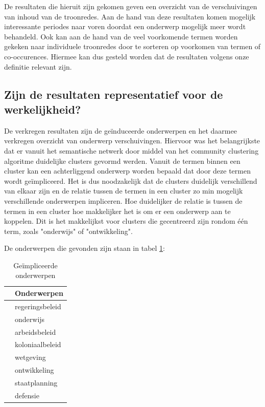 De resultaten die hieruit zijn gekomen geven een overzicht van de verschuivingen van inhoud van de troonredes. Aan de hand van deze resultaten komen mogelijk interessante periodes naar voren doordat een onderwerp mogelijk meer wordt behandeld. Ook kan aan de hand van de veel voorkomende termen worden gekeken naar individuele troonredes door te sorteren op voorkomen van termen of co-occurences. Hiermee kan dus gesteld worden dat de resultaten volgens onze definitie relevant zijn. 

\subsection{Zijn de resultaten representatief voor de werkelijkheid?}

De verkregen resultaten zijn de geïnduceerde onderwerpen en het daarmee verkregen overzicht van onderwerp verschuivingen. Hiervoor was het belangrijkste dat er vanuit het semantische netwerk door middel van het community clustering algoritme duidelijke clusters gevormd werden. Vanuit de termen binnen een cluster kan een achterliggend onderwerp worden bepaald dat door deze termen wordt geïmpliceerd. Het is dus noodzakelijk dat de clusters duidelijk verschillend van elkaar zijn en de relatie tussen de termen in een cluster zo min mogelijk verschillende onderwerpen impliceren. Hoe duidelijker de relatie is tussen de termen in een cluster hoe makkelijker het is om er een onderwerp aan te koppelen. Dit is het makkelijkst voor clusters die gecentreerd zijn rondom één term, zoals "onderwijs" of "ontwikkeling". 

De onderwerpen die gevonden zijn staan in tabel \ref{onderwerpen}:
\begin{table}[H]
\centering
\begin{tabular}{ll}
\toprule
{} &                \textbf{Onderwerpen} \\
\midrule
 &  regeringsbeleid \\
 &        onderwijs \\
 &    arbeidsbeleid \\
 &  koloniaalbeleid \\
 &        wetgeving \\
 &     ontwikkeling \\
 &    staatplanning \\
 &         defensie \\
\bottomrule
\end{tabular}
\caption{Geïmpliceerde onderwerpen}
\label{onderwerpen}
\end{table}

